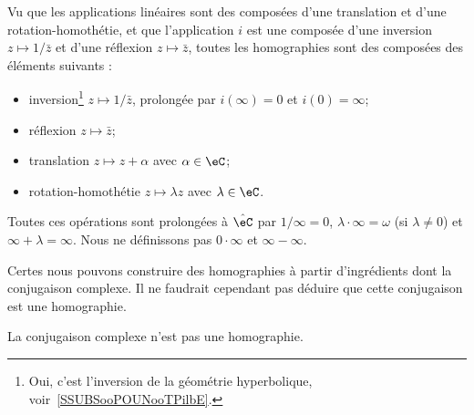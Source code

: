 \begin{normaltext}      \label{NORMooMMKOooQlzjqJ}
	Vu que les applications linéaires sont des composées d'une translation et d'une rotation-homothétie, et que l'application \( i\) est une composée d'une inversion \( z\mapsto 1/\bar z\) et d'une réflexion \( z\mapsto \bar z\), toutes les homographies sont des composées des éléments suivants :
	\begin{itemize}
		\item inversion\footnote{Oui, c'est l'inversion de la géométrie hyperbolique, voir~\ref{SSUBSooPOUNooTPilbE}.} \( z\mapsto 1/\bar z\), prolongée par \( i(\infty)=0\) et \( i(0)=\infty\);
		\item réflexion \( z\mapsto \bar z\);
		\item translation \( z\mapsto z+\alpha\) avec \( \alpha\in \eC\);
		\item rotation-homothétie \( z\mapsto \lambda z\) avec \( \lambda\in \eC\).
	\end{itemize}

	Toutes ces opérations sont prolongées à \( \hat\eC\) par \( 1/\infty=0\), \( \lambda\cdot \infty=\omega\) (si \( \lambda\neq 0\)) et \( \infty+\lambda=\infty\). Nous ne définissons pas \( 0\cdot \infty\) et \( \infty-\infty\).
\end{normaltext}

Certes nous pouvons construire des homographies à partir d'ingrédients dont la conjugaison complexe. Il ne faudrait cependant pas déduire que cette conjugaison est une homographie.

\begin{lemma}       \label{LEMooGDDJooBpJlUf}
	La conjugaison complexe n'est pas une homographie.
\end{lemma}

